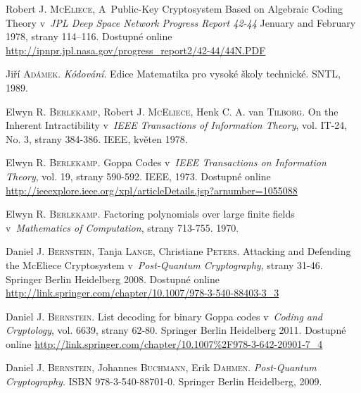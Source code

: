 \documentclass[thesis=M,czech,hidelinks]{FITthesis}[2012/06/26]
\newcommand{\0}{{\textcolor[gray]{0.75}{0}}}
\begin{document}
%
%
\begin{thebibliography}{99}


        Robert J. \textsc{McEliece}, A~Public-Key Cryptosystem Based on
        Algebraic Coding Theory v~\emph{JPL Deep Space Network Progress Report
        42-44} Jenuary and February 1978, strany 114–116. Dostupné online
        \url{http://ipnpr.jpl.nasa.gov/progress_report2/42-44/44N.PDF}

        Jiří \textsc{Adámek}. \emph{Kódování}. Edice Matematika pro vysoké školy
        technické. SNTL, 1989.

        Elwyn R. \textsc{Berlekamp}, Robert J. \textsc{McEliece}, Henk C. A. van
        \textsc{Tilborg}.  On the Inherent Intractibility v~\emph{IEEE
        Transactions of Information Theory}, vol. IT-24, No. 3, strany 384-386.
        IEEE, květen 1978.

        Elwyn R. \textsc{Berlekamp}. Goppa Codes v~\emph{IEEE Transactions on
        Information Theory}, vol. 19, strany 590-592. IEEE, 1973. Dostupné
        online
        \url{http://ieeexplore.ieee.org/xpl/articleDetails.jsp?arnumber=1055088}

        Elwyn R. \textsc{Berlekamp}. Factoring polynomials over large finite
        fields v~\emph{Mathematics of Computation}, strany 713-755. 1970.

        Daniel J. \textsc{Bernstein}, Tanja \textsc{Lange}, Christiane
        \textsc{Peters}. Attacking and Defending the McEliece Cryptosystem
        v~\emph{Post-Quantum Cryptography}, strany 31-46. Springer Berlin
        Heidelberg 2008. Dostupné online
        \url{http://link.springer.com/chapter/10.1007/978-3-540-88403-3\_3}

        Daniel J. \textsc{Bernstein}. List decoding for binary Goppa codes
        v~\emph{Coding and Cryptology}, vol. 6639, strany 62-80. Springer Berlin
        Heidelberg 2011. Dostupné online
        \url{http://link.springer.com/chapter/10.1007\%2F978-3-642-20901-7\_4}

        Daniel J. \textsc{Bernstein}, Johannes \textsc{Buchmann}, Erik
        \textsc{Dahmen}. \emph{Post-Quantum Cryptography}. ISBN
        978-3-540-88701-0.  Springer Berlin Heidelberg, 2009.


\end{thebibliography}
\end{document}
